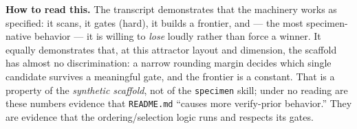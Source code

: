 \textbf{How to read this.} The transcript demonstrates that the machinery works
as specified: it scans, it gates (hard), it builds a frontier, and --- the most
specimen-native behavior --- it is willing to \emph{lose} loudly rather than
force a winner. It equally demonstrates that, at this attractor layout and
dimension, the scaffold has almost no discrimination: a narrow rounding margin
decides which single candidate survives a meaningful gate, and the frontier is a
constant. That is a property of the \emph{synthetic scaffold}, not of the
\texttt{specimen} skill; under no reading are these numbers evidence that
\texttt{README.md} ``causes more verify-prior behavior.'' They are evidence that
the ordering/selection logic runs and respects its gates.